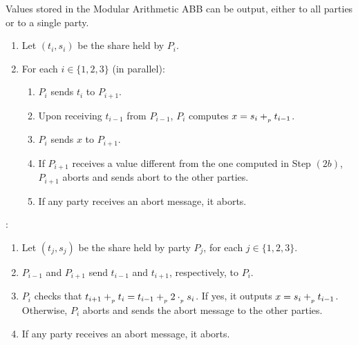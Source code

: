 Values stored in the Modular Arithmetic ABB can be output, either to all parties or to a single party.

\begin{protocol}[Output]
	\begin{enumerate}
		\item Let $(t_i, s_i)$ be the share held by $P_i$.
		\item For each $i \in \{1, 2, 3\}$ (in parallel):
			\begin{enumerate}
                \item $P_i$ sends $t_i$ to $P_{i + 1}$.
                \item Upon receiving $t_{i - 1}$ from $P_{i - 1}$, $P_i$ computes $x = s_i +_{_p} t_{i - 1}$.
                \item $P_i$ sends $x$ to $P_{i + 1}$.
				\item If $P_{i + 1}$ receives a value different from the one computed in Step $(2b)$, $P_{i + 1}$ aborts and sends abort to the other parties.
				\item If any party receives an abort message, it aborts.
			\end{enumerate}
	\end{enumerate}

	\noindent {}:
	\begin{enumerate}
		\item Let $(t_j, s_j)$ be the share held by party $P_j$, for each $j \in \{1, 2, 3\}$.
		\item $P_{i - 1}$ and $P_{i + 1}$ send $t_{i - 1}$ and $t_{i + 1}$, respectively, to $P_i$.
		\item $P_i$ checks that $t_{i + 1} +_{_p} t_i = t_{i - 1} +_{_p} 2 \cdot_{_p} s_i$. If yes, it outputs $x = s_i +_{_p} t_{i - 1}$.
        Otherwise, $P_i$ aborts and sends the abort message to the other parties.
		\item If any party receives an abort message, it aborts.
	\end{enumerate}
\end{protocol}